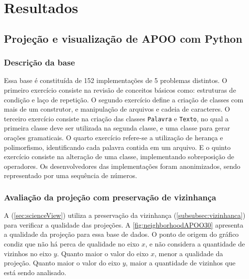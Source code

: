 \chapter{Resultados}
\label{chap:resultados}

	\section{Projeção e visualização de APOO com Python}
	
	\subsection{Descrição da base}
		Essa base é constituída de 152 implementações de 5 problemas distintos. O primeiro exercício
		consiste na revisão de conceitos básicos como: estruturas de condição e laço de repetição. O
		segundo exercício define a criação de classes com mais de um construtor, e manipulação de
		arquivos e cadeia de caracteres. O terceiro exercício consiste na criação das classes
		\texttt{Palavra} e \texttt{Texto}, no qual a primeira classe deve ser utilizada na segunda
		classe, e uma classe para gerar orações gramaticais. O quarto exercício refere-se a
		utilização de herança e polimorfismo, identificando cada palavra contida em um arquivo. E
		o quinto exercício consiste na alteração de uma classe, implementando sobreposição de
		operadores. Os desenvolvedores das implementações foram anonimizados, sendo representado
		por uma sequência de números.
	
	\subsection{Avaliação da projeção com preservação de vizinhança}
	A  (\ref{sec:scienceView}) utiliza a preservação da vizinhança
	(\ref{subsubsec:vizinhanca}) para verificar a qualidade das projeções. A \ref{fig:neighborhoodAPOO30}
	apresenta a qualidade da projeção para essa base de dados. O ponto de origem do
	gráfico condiz que não há perca de qualidade no eixo $x$, e não considera a quantidade
	de vizinhos no eixo $y$. Quanto maior o valor do eixo $x$, menor a qualidade da projeção.
	Quanto maior o valor do eixo $y$, maior a quantidade de vizinhos que está sendo analisado.
	
